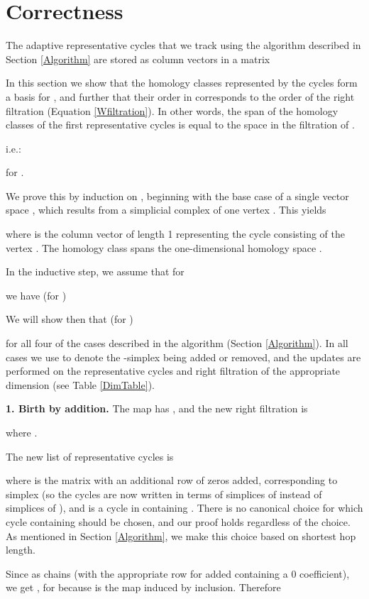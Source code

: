 \documentclass[12pt]{article}
\begin{document}
\section{Correctness}\label{Correctness}

The adaptive representative cycles that we track using the algorithm described in Section \ref{Algorithm} are stored as column vectors  in a matrix 

In this section we show that the homology classes represented by the cycles  form a basis for , and further that their order in  corresponds to the order of the right filtration  (Equation \ref{Wfiltration}). In other words, the span of the homology classes of the first  representative cycles is equal to the  space  in the filtration  of .

i.e.:


for .

We prove this by induction on , beginning with the base case of a single vector space , which results from a simplicial complex of one vertex . This yields


where  is the column vector of length 1 representing the cycle consisting of the vertex . The homology class  spans the one-dimensional homology space .

In the inductive step, we assume that for


we have (for )


We will show then that (for )

for all four of the cases described in the algorithm (Section \ref{Algorithm}). In all cases we use  to denote the -simplex being added or removed, and the updates are performed on the representative cycles and right filtration of the appropriate dimension (see Table \ref{DimTable}).

\textbf{1. Birth by addition.} The map  has , and the new right filtration is

where .

The new list of representative cycles is

where  is the matrix  with an additional row of zeros added, corresponding to simplex  (so the cycles are now written in terms of simplices of  instead of simplices of ), and  is a cycle in  containing . There is no canonical choice for which cycle containing  should be chosen, and our proof holds regardless of the choice. As mentioned in Section \ref{Algorithm}, we make this choice based on shortest hop length.

Since  as chains (with the appropriate row for  added containing a 0 coefficient), we get , for   because  is the map induced by inclusion. Therefore
\end{document}
